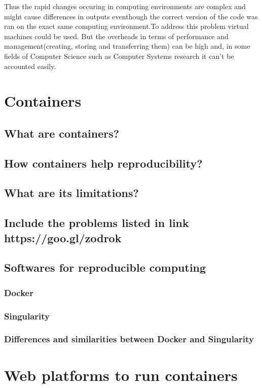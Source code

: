 Thus the rapid changes occuring in computing environments are complex and might cause differences in outputs eventhough the correct version of the code was ran on the exact same computing environment.To address this problem virtual machines could be used. But the overheads in terms of performance and management(creating, storing and transferring them) can be high and, in some fields of Computer Science such as Computer Systems research it can't be accounted easily.\cite{7092948}
 
\section{Containers}
\subsection{What are containers?}
\subsection{How containers help reproducibility?}
\subsection{What are its limitations?}
\subsection{Include the problems listed in link https://goo.gl/zodrok}
\subsection{Softwares for reproducible computing}
\subsubsection{Docker}
\subsubsection{Singularity}
\subsubsection{Differences and similarities between Docker and Singularity}

\section{Web platforms to run containers}
